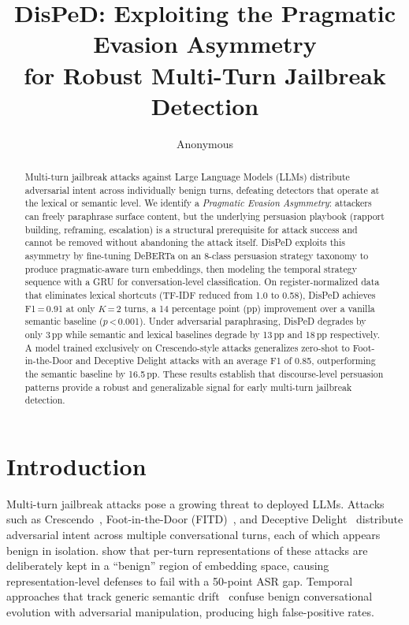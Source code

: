 \documentclass[11pt,a4paper]{article}
\title{DisPeD: Exploiting the Pragmatic Evasion Asymmetry\\for Robust Multi-Turn Jailbreak Detection}
\author{Anonymous}
\date{}
\begin{document}
\maketitle

\begin{abstract}
Multi-turn jailbreak attacks against Large Language Models (LLMs) distribute adversarial intent across individually benign turns, defeating detectors that operate at the lexical or semantic level. We identify a \emph{Pragmatic Evasion Asymmetry}: attackers can freely paraphrase surface content, but the underlying persuasion playbook (rapport building, reframing, escalation) is a structural prerequisite for attack success and cannot be removed without abandoning the attack itself. DisPeD exploits this asymmetry by fine-tuning DeBERTa on an 8-class persuasion strategy taxonomy to produce pragmatic-aware turn embeddings, then modeling the temporal strategy sequence with a GRU for conversation-level classification. On register-normalized data that eliminates lexical shortcuts (TF-IDF reduced from 1.0 to 0.58), DisPeD achieves F1\,=\,0.91 at only $K$\,=\,2 turns, a 14 percentage point (pp) improvement over a vanilla semantic baseline ($p$\,<\,0.001). Under adversarial paraphrasing, DisPeD degrades by only 3\,pp while semantic and lexical baselines degrade by 13\,pp and 18\,pp respectively. A model trained exclusively on Crescendo-style attacks generalizes zero-shot to Foot-in-the-Door and Deceptive Delight attacks with an average F1 of 0.85, outperforming the semantic baseline by 16.5\,pp. These results establish that discourse-level persuasion patterns provide a robust and generalizable signal for early multi-turn jailbreak detection.
\end{abstract}

\section{Introduction}

Multi-turn jailbreak attacks pose a growing threat to deployed LLMs. Attacks such as Crescendo~\citep{russinovich2024greatnow}, Foot-in-the-Door (FITD)~\citep{zhou2024speak}, and Deceptive Delight~\citep{jiang2024deceptive} distribute adversarial intent across multiple conversational turns, each of which appears benign in isolation. \citet{bullwinkel2025multiturn} show that per-turn representations of these attacks are deliberately kept in a ``benign'' region of embedding space, causing representation-level defenses to fail with a 50-point ASR gap. Temporal approaches that track generic semantic drift~\citep{su2026deepcontext} confuse benign conversational evolution with adversarial manipulation, producing high false-positive rates.
\end{document}

